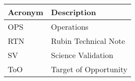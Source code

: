 \addtocounter{table}{-1}
\begin{longtable}{p{}p{}}\hline
\textbf{Acronym} & \textbf{Description}  \\\hline

OPS & Operations \\\hline
RTN & Rubin Technical Note \\\hline
SV & Science Validation \\\hline
ToO & Target of Opportunity \\\hline
\end{longtable}
